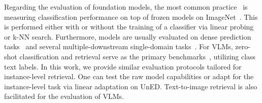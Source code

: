 Regarding the evaluation of foundation models, the most common practice~\cite{odm+24,fwx+23,evaclip} is measuring classification performance on top of frozen models on ImageNet~\cite{dds+09}. 
This is performed either with or without the training of a classifier via linear probing or k-NN search. 
Furthermore, models are usually evaluated on dense prediction tasks~\cite{odm+24} and several multiple-downstream single-domain tasks~\cite{ady+23}. For VLMs, zero-shot classification and retrieval serve as the primary benchmarks~\cite{clip,siglip,metaclip}, utilizing class text labels. 
In this work, we provide similar evaluation protocols tailored for instance-level retrieval. 
One can test the raw model capabilities or adapt for the instance-level task via linear adaptation on UnED.
Text-to-image retrieval is also facilitated for the evaluation of VLMs.
